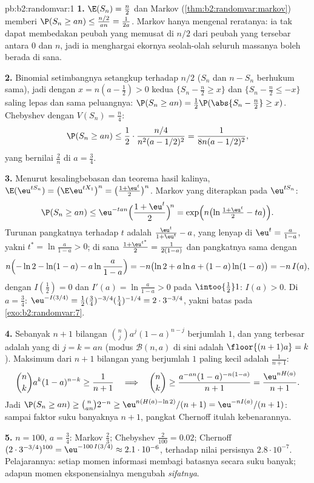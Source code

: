 \begin{solution}{pb:b2:randomvar:1}
\textbf{1.} $\E(S_n) = \frac n2$ dan Markov
(\cref{thm:b2:randomvar:markov}) memberi $\P(S_n \geq an) \leq
\frac{n/2}{an} = \frac1{2a}$. Markov hanya mengenal reratanya: ia
tak dapat membedakan peubah yang memusat di $n/2$ dari peubah yang
tersebar antara $0$ dan $n$, jadi ia menghargai ekornya seolah-olah
seluruh massanya boleh berada di sana.

\textbf{2.} Binomial setimbangnya setangkup terhadap $n/2$
($S_n$ dan $n - S_n$ berhukum sama), jadi dengan $x = n(a -
\frac12) > 0$ kedua  $\{S_n - \frac n2 \geq x\}$ dan
$\{S_n - \frac n2 \leq -x\}$ saling lepas dan sama peluangnya:
$\P(S_n \geq an) = \frac12\P(\abs{S_n - \frac n2} \geq x)$.
Chebyshev dengan $V(S_n) = \frac n4$:
\[
\P(S_n \geq an)
\leq \frac12\cdot\frac{n/4}{n^2(a - 1/2)^2}
= \frac1{8n(a - 1/2)^2},
\]
yang bernilai $\frac2n$ di $a = \frac34$.

\textbf{3.} Menurut kesalingbebasan dan teorema hasil kalinya,
$\E(\eu^{tS_n}) = \bigl(\E \eu^{tX_1}\bigr)^n = \bigl(\frac{1
+ \eu^t}2\bigr)^n$. Markov yang diterapkan pada $\eu^{tS_n}$:
\[
\P(S_n \geq an) \leq \eu^{-tan}\Bigl(\frac{1 +
\eu^t}2\Bigr)^{\!n} = \exp\Bigl(n\bigl(\ln\tfrac{1 +
\eu^t}2 - ta\bigr)\Bigr).
\]
Turunan pangkatnya terhadap $t$ adalah $\frac{\eu^t}{1 + \eu^t}
- a$, yang lenyap di $\eu^t = \frac a{1-a}$, yakni $t^* =
\ln\frac a{1-a} > 0$; di sana $\frac{1 + \eu^{t^*}}2 =
\frac1{2(1-a)}$ dan pangkatnya sama dengan
\[
n\Bigl(-\ln 2 - \ln(1-a) - a\ln\frac a{1-a}\Bigr)
= -n\bigl(\ln2 + a\ln a + (1-a)\ln(1-a)\bigr) = -n\,I(a),
\]
dengan $I(\frac12) = 0$ dan $I'(a) = \ln\frac a{1-a} > 0$ pada
$\intoo{\frac12}1$: $I(a) > 0$. Di $a = \frac34$:
$\eu^{-I(3/4)} = \frac12(\tfrac34)^{-3/4}(\tfrac14)^{-1/4} =
2\cdot3^{-3/4}$, yakni batas pada \cref{exo:b2:randomvar:7}.

\textbf{4.} Sebanyak $n + 1$ bilangan $\binom nja^j(1-a)^{n-j}$ berjumlah
$1$, dan yang terbesar adalah yang di $j = k = an$ (modus
$\mathcal B(n, a)$ di sini adalah $\floor{(n+1)a} = k$). Maksimum
dari $n + 1$ bilangan yang berjumlah $1$ paling kecil adalah
$\frac1{n+1}$:
\[
\binom nk a^k(1-a)^{n-k} \geq \frac1{n+1}
\quad\Longrightarrow\quad
\binom nk \geq \frac{a^{-an}(1-a)^{-n(1-a)}}{n+1}
= \frac{\eu^{nH(a)}}{n+1}.
\]
Jadi $\P(S_n \geq an) \geq \binom{n}{an}2^{-n} \geq
\eu^{n(H(a) - \ln2)}/(n+1) = \eu^{-nI(a)}/(n+1)$: sampai
faktor suku banyaknya $n + 1$, pangkat Chernoff itulah kebenarannya.

\textbf{5.} $n = 100$, $a = \frac34$: Markov $\frac23$;
Chebyshev $\frac2{100} = 0.02$; Chernoff
$(2\cdot3^{-3/4})^{100} = \eu^{-100\,I(3/4)} \approx
2.1\cdot10^{-6}$, terhadap nilai persisnya $2.8\cdot10^{-7}$. Pelajarannya:
setiap momen informasi membagi batasnya secara suku banyak;
adapun momen eksponensialnya mengubah \emph{sifatnya}.


\end{solution}
